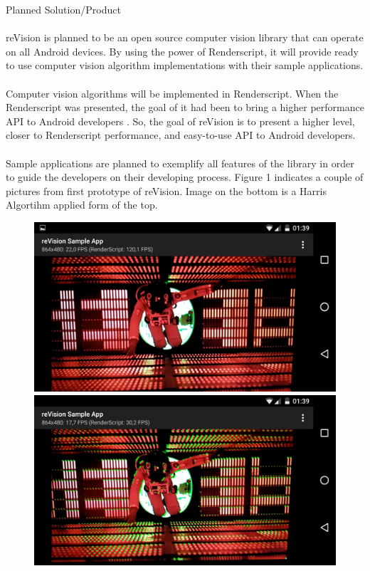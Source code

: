 \documentclass[12pt, a4paper]{article} \pagenumbering{gobble}
\begin{document}
\begin{section}{Planned Solution/Product}
  \paragraph{}{
  reVision is planned to be an open source computer vision library that can operate on all Android devices.
  By using the power of Renderscript, it will provide ready to use computer vision algorithm implementations
  with their sample applications.
  }
  \paragraph{}{
  Computer vision algorithms will be implemented in Renderscript. When the Renderscript was presented, the goal of
  it had been to bring a higher performance API to Android developers \cite{renderscript_release}.
  So, the goal of reVision is to present a higher level, closer to Renderscript performance, and easy-to-use
  API to Android developers.
  }
  \paragraph{}{
  Sample applications are planned to exemplify all features of the library in order to guide the developers on
  their developing process. Figure 1 indicates a couple of pictures from first prototype of reVision. Image on the
  bottom is a Harris Algortihm applied form of the top.

  }
  \begin{figure}[h]
    \centering
    \includegraphics[scale=0.25]{clean.png}
    \includegraphics[scale=0.25]{detected.png}


\end{figure}
\end{section}
\end{document}
